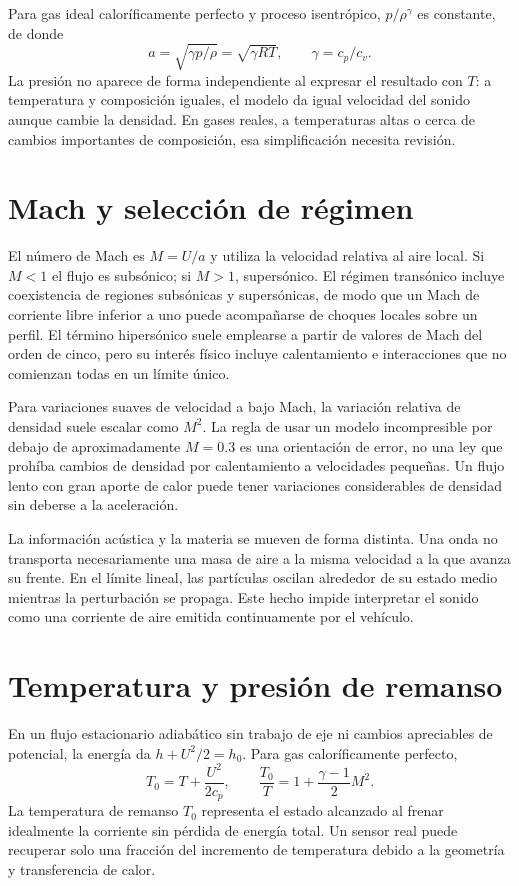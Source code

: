 Para gas ideal caloríficamente perfecto y proceso isentrópico, $p/\rho^\gamma$ es constante, de donde
\begin{equation}
 a=\sqrt{\gamma p/\rho}=\sqrt{\gamma RT},\qquad \gamma=c_p/c_v.
\end{equation}
La presión no aparece de forma independiente al expresar el resultado con $T$: a temperatura y composición iguales, el modelo da igual velocidad del sonido aunque cambie la densidad. En gases reales, a temperaturas altas o cerca de cambios importantes de composición, esa simplificación necesita revisión.

\section{Mach y selección de régimen}
El número de Mach es $M=U/a$ y utiliza la velocidad relativa al aire local. Si $M<1$ el flujo es subsónico; si $M>1$, supersónico. El régimen transónico incluye coexistencia de regiones subsónicas y supersónicas, de modo que un Mach de corriente libre inferior a uno puede acompañarse de choques locales sobre un perfil. El término hipersónico suele emplearse a partir de valores de Mach del orden de cinco, pero su interés físico incluye calentamiento e interacciones que no comienzan todas en un límite único.

Para variaciones suaves de velocidad a bajo Mach, la variación relativa de densidad suele escalar como $M^2$. La regla de usar un modelo incompresible por debajo de aproximadamente $M=0.3$ es una orientación de error, no una ley que prohíba cambios de densidad por calentamiento a velocidades pequeñas. Un flujo lento con gran aporte de calor puede tener variaciones considerables de densidad sin deberse a la aceleración.

La información acústica y la materia se mueven de forma distinta. Una onda no transporta necesariamente una masa de aire a la misma velocidad a la que avanza su frente. En el límite lineal, las partículas oscilan alrededor de su estado medio mientras la perturbación se propaga. Este hecho impide interpretar el sonido como una corriente de aire emitida continuamente por el vehículo.

\section{Temperatura y presión de remanso}
En un flujo estacionario adiabático sin trabajo de eje ni cambios apreciables de potencial, la energía da $h+U^2/2=h_0$. Para gas caloríficamente perfecto,
\begin{equation}\label{eq:08-T0}
 T_0=T+\frac{U^2}{2c_p},\qquad
 \frac{T_0}{T}=1+\frac{\gamma-1}{2}M^2.
\end{equation}
La temperatura de remanso $T_0$ representa el estado alcanzado al frenar idealmente la corriente sin pérdida de energía total. Un sensor real puede recuperar solo una fracción del incremento de temperatura debido a la geometría y transferencia de calor.

